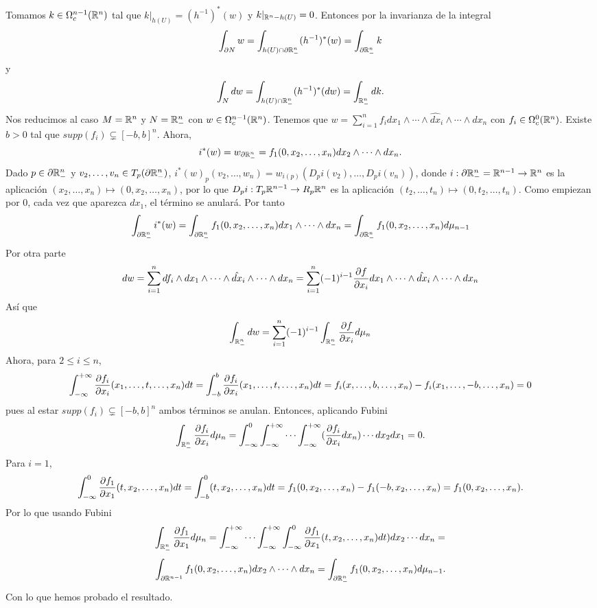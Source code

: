 \documentclass[CV.tex]{subfiles}
\begin{document}
\begin{dem}
Tomamos $k\in\Omega_c^{n-1}(\mathbb{R}^n)$ tal que $k|_{h(U)}= (h^{-1})^*(w)$ y $k|_{\mathbb{R}^n-h(U)}=0$. Entonces por la invarianza de la integral
\[
\int_{\partial N} w=\int_{h(U)\cap \partial \mathbb{R}^n_-} (h^{-1})^*(w)=\int_{\partial\mathbb{R}^n_-} k
\]
y 
\[
\int_N dw=\int_{h(U)\cap\mathbb{R}^n_-}(h^{-1})^*(dw)=\int_{\mathbb{R}^n_-}dk.
\]
Nos reducimos al caso $M=\mathbb{R}^n$ y $N=\mathbb{R}^n_-$ con $w\in\Omega_c^{n-1}(\mathbb{R}^n)$. Tenemos que $w=\sum_{i=1}^n f_i dx_1\land\cdots\land \hat{dx}_i\land\cdots\land dx_n$ con $f_i\in\Omega_c^0(\mathbb{R}^n)$. Existe $b>0$ tal que $supp(f_i)\subsetneq [-b,b]^n$. Ahora, 
\[
i^*(w)=w_{\partial\mathbb{R}^n_-}=f_1(0,x_2,\dots, x_n)dx_2\land\cdots\land dx_n.
\]
Dado $p\in\partial\mathbb{R}^n_-$ y $v_2,\dots, v_n\in T_p(\partial\mathbb{R}^n_-)$, $i^*(w)_p(v_2,\dots, w_n)=w_{i(p)}(D_pi(v_2),\dots, D_pi(v_n))$, donde $i:\partial\mathbb{R}^n_-=\mathbb{R}^{n-1}\to \mathbb{R}^n$ es la aplicación $(x_2,\dots, x_n)\mapsto (0,x_2,\dots, x_n)$, por lo que $D_p i:T_p\mathbb{R}^{n-1}\to R_p\mathbb{R}^n$ es la aplicación $(t_2,\dots, t_n)\mapsto (0,t_2,\dots, t_n)$. Como empiezan por 0, cada vez que aparezca $dx_1$, el término se anulará. Por tanto
\[
\int_{\partial\mathbb{R}^n_-}i^*(w)=\int_{\partial\mathbb{R}^n_-} f_1(0,x_2,\dots, x_n)dx_1\land\cdots\land dx_n=\int_{\partial\mathbb{R}^n_-}f_1(0,x_2,\dots, x_n) d\mu_{n-1}
\]
Por otra parte
\[
dw=\sum_{i=1}^n df_i\land dx_1\land\cdots\land \hat{dx}_i\land\cdots\land dx_n=\sum_{i=1}^n(-1)^{i-1}\frac{\partial f}{\partial x_i}dx_1\land\cdots\land \hat{dx}_i\land\cdots\land dx_n
\]
Así que
\[
\int_{\mathbb{R}^n_-}dw=\sum_{i=1}^n(-1)^{i-1}\int_{\mathbb{R}^n_-}\frac{\partial f}{\partial x_i}d\mu_n
\]
Ahora, para $2\leq i\leq n$, 
\[
\int_{-\infty}^{+\infty}\frac{\partial f_i}{\partial x_i}(x_1, \dots, t,\dots, x_n)dt =\int_{-b}^b\frac{\partial f_i}{\partial x_i}(x_1,\dots, t,\dots, x_n)dt=f_i(x,\dots, b,\dots, x_n)-f_i(x_1,\dots, -b, \dots, x_n)=0
\]
pues al estar $supp(f_i)\subsetneq [-b,b]^n$ ambos términos se anulan. Entonces, aplicando Fubini
\[
\int_{\mathbb{R}^n_-}\frac{\partial f_i}{\partial x_i}d\mu_n=\int_{-\infty}^0\int_{-\infty}^{+\infty}\cdots\int_{-\infty}^{+\infty} (\frac{\partial f_i}{\partial x_i}dx_n)\cdots dx_2dx_1=0.
\]
Para $i=1$, 
\[
\int_{-\infty}^0\frac{\partial f_1}{\partial x_1}(t,x_2,\dots, x_n)dt=\int_{-b}^0(t,x_2,\dots, x_n)dt=f_1(0,x_2,\dots, x_n)-f_1(-b,x_2,\dots, x_n)=f_1(0,x_2,\dots, x_n).
\]
Por lo que usando Fubini
\[
\int_{\mathbb{R}^n_-}\frac{\partial f_1}{\partial x_1}d\mu_n=\int_{-\infty}^{+\infty}\cdots\int_{-\infty}^{+\infty}\int_{-\infty}^0\frac{\partial f_1}{\partial x_1}(t,x_2,\dots, x_n)dt)dx_2\cdots dx_n=
\]
\[
\int_{\partial\mathbb{R}^{n-1}}f_1(0,x_2,\dots, x_n)dx_2\land\cdots\land dx_n=\int_{\partial\mathbb{R}^n_-}f_1(0,x_2,\dots, x_n)d\mu_{n-1}.
\]
Con lo que hemos probado el resultado.
\QED
\end{dem}
\end{document}
